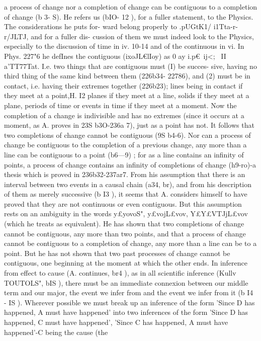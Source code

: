 {{{{{{{{{{{{{{{{{{{{{{{{{{{{{{{{{{{{{{{{{{{{{{{{{{{{{{{{{{{{{{{a process of change nor a completion of change can be contiguous
to a completion of change (b 3- S). He refers us (bIO- 12 ), for a
fuller statement, to the Physics. The considerations he puts for-
ward belong properly to .pUGtK1/ i1Tta-r-r/JLTJ, and for a fuller dis-
cussion of them we must indeed look to the Physics, especially to
the discussion of time in iv. 10-14 and of the continuous in vi.
In Phys. 227"6 he defInes the contiguous (ixoJL€lIoy) as 0 ay i.p€~ij<;
~II a'TT77}Tat. I.e. two things that are contiguous must (I) be succes-
sive, having no third thing of the same kind between them (226b34-
22786), and (2) must be in contact, i.e. having their extremes
together (226b23); lines being in contact if they meet at a point,H.
I2
planes if they meet at a line, solids if they meet at a plane, periods
of time or events in time if they meet at a moment. Now the
completion of a change is indivisible and has no extremes (since
it occurs at a moment, as A. proves in 23S b3O-236a 7), just as a
point has not. It follows that two completions of change cannot
be contiguous (9S b4-6). Nor can a process of change be contiguous
to the completion of a previous change, any more than a line can
be contiguous to a point (b6---9) ; for as a line contains an infinity
of points, a process of change contains an infinity of completions
of change (h9-ro)-a thesis which is proved in 236b32-237ar7.
From his assumption that there is an interval between two
events in a causal chain (a34, br), and from his description of them
as merely successive (b I3 ), it seems that A. considers himself
to have proved that they are not continuous or even contiguous.
But this assumption rests on an ambiguity in the words y£yovoS",
y£vojL£vov, Y£Y£VTJjL£vov (which he treats as equivalent). He has
shown that two completions of change cannot be contiguous,
any more than two points, and that a process of change cannot
be contiguous to a completion of change, any more than a line
can be to a point. But he has not shown that two past processes
of change cannot be contiguous, one beginning at the moment at
which the other ends.
In inference from effect to cause (A. continues, br4 ), as in all
scientific inference (Kullv TOUTOLS", bIS ), there must be an immediate
connexion between our middle term and our major, the event
we infer from and the event we infer from it (b I4 - IS ). Wherever
possible we must break up an inference of the form 'Since D
has happened, A must have happened' into two inferences of the
form 'Since D has happened, C must have happened', 'Since C
has happened, A must have happened'-C being the cause (the
}}}}}}}}}}}}}}}}}}}}}}}}}}}}}}}}}}}}}}}}}}}}}}}}}}}}}}}}}}}}}}
